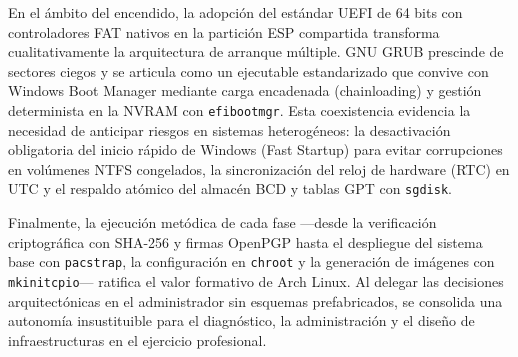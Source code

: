 \documentclass[12pt]{article}
\begin{document}
En el ámbito del encendido, la adopción del estándar UEFI de 64 bits con controladores FAT nativos en la partición ESP compartida transforma cualitativamente la arquitectura de arranque múltiple. GNU GRUB prescinde de sectores ciegos y se articula como un ejecutable estandarizado que convive con Windows Boot Manager mediante carga encadenada (chainloading) y gestión determinista en la NVRAM con \texttt{efibootmgr}. Esta coexistencia evidencia la necesidad de anticipar riesgos en sistemas heterogéneos: la desactivación obligatoria del inicio rápido de Windows (Fast Startup) para evitar corrupciones en volúmenes NTFS congelados, la sincronización del reloj de hardware (RTC) en UTC y el respaldo atómico del almacén BCD y tablas GPT con \texttt{sgdisk}.

Finalmente, la ejecución metódica de cada fase —desde la verificación criptográfica con SHA-256 y firmas OpenPGP hasta el despliegue del sistema base con \texttt{pacstrap}, la configuración en \texttt{chroot} y la generación de imágenes con \texttt{mkinitcpio}— ratifica el valor formativo de Arch Linux. Al delegar las decisiones arquitectónicas en el administrador sin esquemas prefabricados, se consolida una autonomía insustituible para el diagnóstico, la administración y el diseño de infraestructuras en el ejercicio profesional.

\nocite{*}
\begingroup
\setlength\bibitemsep{3pt}
\printbibliography[heading=bibintoc, title={Referencias}]
\endgroup
\end{document}
